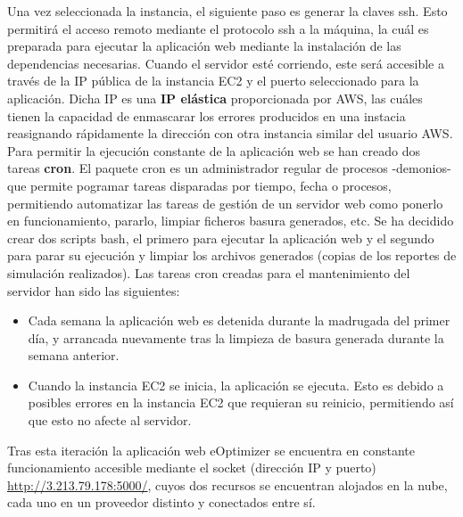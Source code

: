 Una vez seleccionada la instancia, el siguiente paso es generar la claves ssh. Esto permitirá el acceso remoto mediante el protocolo ssh a la máquina, la cuál es preparada para ejecutar la aplicación web mediante la instalación de las dependencias necesarias. Cuando el servidor esté corriendo, este será accesible a través de la IP pública de la instancia \gls{EC2} y el puerto seleccionado para la aplicación. Dicha IP es una \textbf{IP elástica} proporcionada por \gls{AWS}, las cuáles tienen la capacidad de enmascarar los errores producidos en una instacia reasignando rápidamente la dirección con otra instancia similar del usuario \gls{AWS}. Para permitir la ejecución constante de la aplicación web se han creado dos tareas \textbf{cron}. El paquete cron es un administrador regular de procesos -demonios- que permite pogramar tareas disparadas por tiempo, fecha o procesos, permitiendo automatizar las tareas de gestión de un servidor web como ponerlo en funcionamiento, pararlo, limpiar ficheros basura generados, etc. Se ha decidido crear dos scripts bash, el primero para ejecutar la aplicación web y el segundo para parar su ejecución y limpiar los archivos generados (copias de los reportes de simulación realizados). Las tareas cron creadas para el mantenimiento del servidor han sido las siguientes:
\begin{itemize}
\item Cada semana la aplicación web es detenida durante la madrugada del primer día, y arrancada nuevamente tras la limpieza de basura generada durante la semana anterior.
\item Cuando la instancia \gls{EC2} se inicia, la aplicación se ejecuta. Esto es debido a posibles errores en la instancia \gls{EC2} que requieran su reinicio, permitiendo así que esto no afecte al servidor.
\end{itemize}

Tras esta iteración la aplicación web eOptimizer se encuentra en constante funcionamiento accesible mediante el socket (dirección IP y puerto) \url{http://3.213.79.178:5000/}, cuyos dos recursos se encuentran alojados en la nube, cada uno en un proveedor distinto y conectados entre sí.\\

\centerline{}
